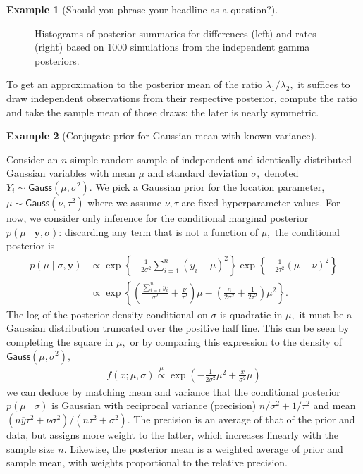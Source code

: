\documentclass[
  11pt,
  letterpaper,
]{scrbook}
\theoremstyle{definition}
\newtheorem{example}{Example}[chapter]
\theoremstyle{plain}
\theoremstyle{plain}
\theoremstyle{plain}
\theoremstyle{definition}
\theoremstyle{definition}
\theoremstyle{plain}
\theoremstyle{plain}
\theoremstyle{remark}
\begin{document}
\begin{example}[Should you phrase your headline as a
question?]
\begin{figure}[ht!]
{}

\caption{\label{fig-hist-difference_rates}Histograms of posterior
summaries for differences (left) and rates (right) based on 1000
simulations from the independent gamma posteriors.}

\end{figure}%

To get an approximation to the posterior mean of the ratio
\(\lambda_1/\lambda_2,\) it suffices to draw independent observations
from their respective posterior, compute the ratio and take the sample
mean of those draws: the later is nearly symmetric.

\end{example}

\begin{example}[Conjugate prior for Gaussian mean with known
variance]\protect\hypertarget{exm-conjugatepriors-normal}{}\label{exm-conjugatepriors-normal}

Consider an \(n\) simple random sample of independent and identically
distributed Gaussian variables with mean \(\mu\) and standard deviation
\(\sigma,\) denoted \(Y_i \sim \mathsf{Gauss}(\mu, \sigma^2).\) We pick
a Gaussian prior for the location parameter,
\(\mu \sim \mathsf{Gauss}(\nu, \tau^2)\) where we assume \(\nu, \tau\)
are fixed hyperparameter values. For now, we consider only inference for
the conditional marginal posterior
\(p(\mu \mid \boldsymbol{y}, \sigma)\): discarding any term that is not
a function of \(\mu,\) the conditional posterior is \begin{align*}
p(\mu \mid \sigma, \boldsymbol{y}) &\propto \exp\left\{ -\frac{1}{2\sigma^2}\sum_{i=1}^n (y_{i}-\mu)^2\right\} \exp\left\{-\frac{1}{2\tau^2}(\mu - \nu)^2\right\}
\\&\propto \exp\left\{\left(\frac{\sum_{i=1}^n y_{i}}{\sigma^2} + \frac{\nu}{\tau^2}\right)\mu - \left( \frac{n}{2\sigma^2} +\frac{1}{2\tau^2}\right)\mu^2\right\}.
\end{align*} The log of the posterior density conditional on \(\sigma\)
is quadratic in \(\mu,\) it must be a Gaussian distribution truncated
over the positive half line. This can be seen by completing the square
in \(\mu,\) or by comparing this expression to the density of
\(\mathsf{Gauss}(\mu, \sigma^2),\) \begin{align*}
f(x; \mu, \sigma) \stackrel{\mu}{\propto} \exp\left(-\frac{1}{2 \sigma^2}\mu^2 + \frac{x}{\sigma^2}\mu\right)
\end{align*} we can deduce by matching mean and variance that the
conditional posterior \(p(\mu \mid \sigma)\) is Gaussian with reciprocal
variance (precision) \(n/\sigma^2 + 1/\tau^2\) and mean
\((n\overline{y}\tau^2 + \nu \sigma^2)/(n\tau^2 + \sigma^2).\) The
precision is an average of that of the prior and data, but assigns more
weight to the latter, which increases linearly with the sample size
\(n.\) Likewise, the posterior mean is a weighted average of prior and
sample mean, with weights proportional to the relative precision.

\end{example}
\end{document}
